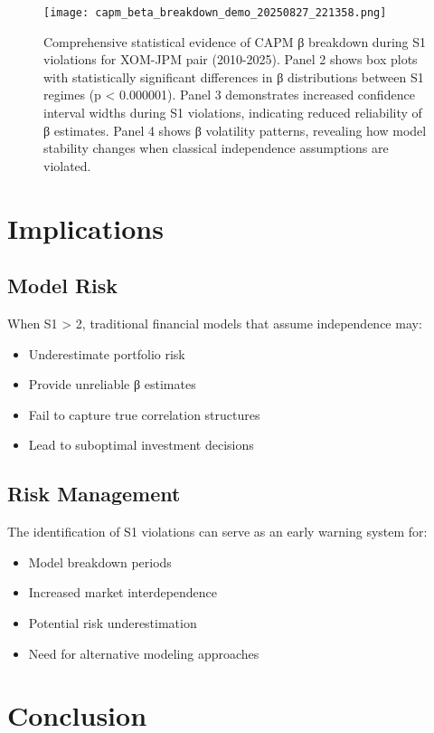 \documentclass[11pt,a4paper]{article}
\begin{document}
\begin{figure}[H]
\centering
\texttt{[image: capm\_beta\_breakdown\_demo\_20250827\_221358.png]}
\caption{Comprehensive statistical evidence of CAPM β breakdown during S1 violations for XOM-JPM pair (2010-2025). Panel 2 shows box plots with statistically significant differences in β distributions between S1 regimes (p < 0.000001). Panel 3 demonstrates increased confidence interval widths during S1 violations, indicating reduced reliability of β estimates. Panel 4 shows β volatility patterns, revealing how model stability changes when classical independence assumptions are violated.}
\label{fig:capm_breakdown}
\end{figure}

\section{Implications}

\subsection{Model Risk}
When S1 > 2, traditional financial models that assume independence may:
\begin{itemize}
\item Underestimate portfolio risk
\item Provide unreliable β estimates
\item Fail to capture true correlation structures
\item Lead to suboptimal investment decisions
\end{itemize}

\subsection{Risk Management}
The identification of S1 violations can serve as an early warning system for:
\begin{itemize}
\item Model breakdown periods
\item Increased market interdependence
\item Potential risk underestimation
\item Need for alternative modeling approaches
\end{itemize}

\section{Conclusion}
\end{document}
